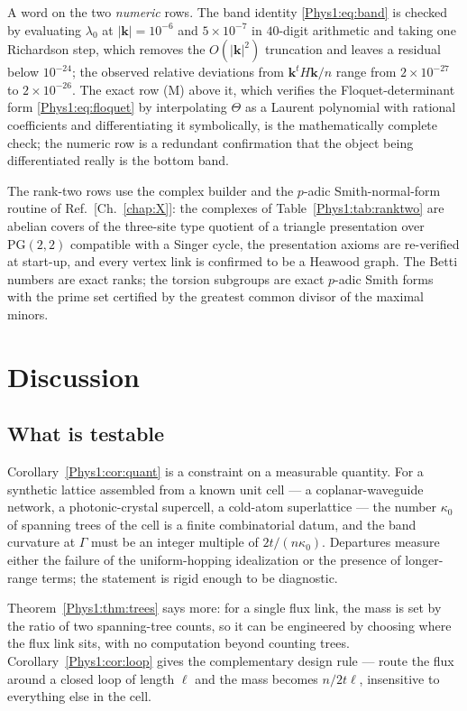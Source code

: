 A word on the two \emph{numeric} rows. The band identity \eqref{Phys1:eq:band} is checked by
evaluating $\lambda_0$ at $|\bm k|=10^{-6}$ and $5\times10^{-7}$ in $40$-digit arithmetic
and taking one Richardson step, which removes the $O(|\bm k|^{2})$ truncation and leaves a
residual below $10^{-24}$; the observed relative deviations from $\bm k^{t}H\bm k/n$ range
from $2\times10^{-27}$ to $2\times10^{-26}$. The exact row (M) above it, which verifies the
Floquet-determinant form \eqref{Phys1:eq:floquet} by interpolating $\Theta$ as a Laurent
polynomial with rational coefficients and differentiating it symbolically, is the
mathematically complete check; the numeric row is a redundant confirmation that the object
being differentiated really is the bottom band.

The rank-two rows use the complex builder and the $p$-adic Smith-normal-form routine of
Ref.~[Ch.~\ref{chap:X}]: the complexes of Table~\ref{Phys1:tab:ranktwo} are abelian covers of
the three-site type quotient of a triangle presentation over $\mathrm{PG}(2,2)$ compatible
with a Singer cycle, the presentation axioms are re-verified at start-up, and every vertex
link is confirmed to be a Heawood graph. The Betti numbers are exact ranks; the torsion
subgroups are exact $p$-adic Smith forms with the prime set certified by the greatest common
divisor of the maximal minors.

\section{Discussion}\label{Phys1:sec:disc}

\subsection{What is testable}

Corollary~\ref{Phys1:cor:quant} is a constraint on a measurable quantity. For a synthetic lattice
assembled from a known unit cell --- a coplanar-waveguide network, a photonic-crystal
supercell, a cold-atom superlattice --- the number $\kappa_0$ of spanning trees of the cell
is a finite combinatorial datum, and the band curvature at $\Gamma$ must be an integer
multiple of $2t/(n\kappa_0)$. Departures measure either the failure of the uniform-hopping
idealization or the presence of longer-range terms; the statement is rigid enough to be
diagnostic.

Theorem~\ref{Phys1:thm:trees} says more: for a single flux link, the mass is set by the ratio of
two spanning-tree counts, so it can be engineered by choosing where the flux link sits, with
no computation beyond counting trees. Corollary~\ref{Phys1:cor:loop} gives the complementary
design rule --- route the flux around a closed loop of length $\ell$ and the mass becomes
$n/2t\ell$, insensitive to everything else in the cell.

